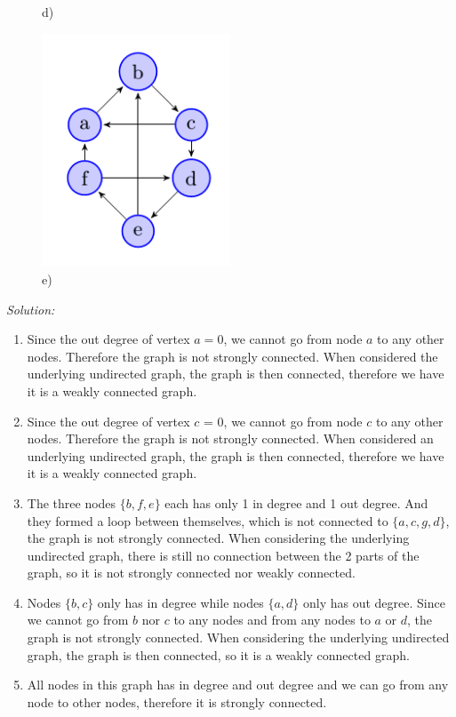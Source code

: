 \documentclass[a4paper]{article}
\begin{document}
\begin{figure}[H]
\begin{minipage}{0.3\textwidth}
			\caption*{d)}
		\end{minipage}
		\begin{minipage}{0.3\textwidth}
			\centering
			\includegraphics[width=0.5\textwidth]{tut91_5.png}
			\caption*{e)}
		\end{minipage}
	\end{figure}
	\textit{Solution:}
	\begin{enumerate}[label = \alph*)]
	    \item 
	    Since the out degree of vertex $a = 0$, we cannot go from node $a$ to any other nodes. Therefore the graph is not strongly connected. When considered the underlying undirected graph, the graph is then connected, therefore we have it is a weakly connected graph.
	    \item 
    	Since the out degree of vertex $c$ = 0, we cannot go from node $c$ to any other nodes. Therefore the graph is not strongly connected. When considered an underlying undirected graph, the graph is then connected, therefore we have it is a weakly connected graph.
    	\item 
    	The three nodes $\{b,f,e\}$ each has only 1 in degree and 1 out degree. And they formed a loop between themselves, which is not connected to $\{a,c,g,d\}$, the graph is not strongly connected. When considering the underlying undirected graph, there is still no connection between the 2 parts of the graph, so it is not strongly connected nor weakly connected.
    	\item 
    	Nodes $\{b,c\}$ only has in degree while nodes $\{a,d\}$ only has out degree. Since we cannot go from $b$ nor $c$ to any nodes and from any nodes to $a$ or $d$, the graph is not strongly connected. When considering the underlying undirected graph, the graph is then connected, so it is a weakly connected graph.
    	\item 
    	All nodes in this graph has in degree and out degree and we can go from any node to other nodes, therefore it is strongly connected.
	\end{enumerate}
\end{document}
